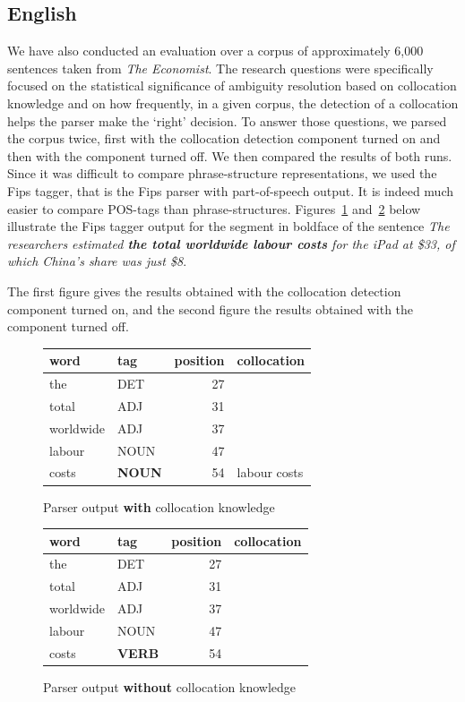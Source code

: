 \documentclass[output=paper]{langsci/langscibook}
\begin{document}
\subsection{English}
We have also conducted an evaluation over a corpus of approximately 6,000 sentences taken from \textit{The Economist}. The research questions were specifically focused on the statistical significance of ambiguity resolution based on collocation knowledge and on how frequently, in a given corpus, the detection of a collocation helps the parser make the `right' decision. 
To answer those questions, we parsed the corpus twice, first with the collocation detection component turned on and then with the component turned off. We then compared the results of both runs. Since it was difficult to compare phrase-structure representations, we used the Fips tagger, that is the Fips parser with part-of-speech output. It is indeed much easier to compare POS-tags than phrase-structures. Figures~\ref{fig7} and~\ref{fig8} below illustrate the Fips tagger output for the segment in boldface of the sentence \textit{The researchers estimated \textbf{the total worldwide labour costs} for the iPad at \$33, of which China’s share was just \$8}.

The first figure gives the results obtained with the collocation detection component turned on, and the second figure the results obtained with the component turned off.
 
\begin{figure}
\begin{tabular}{llrl}
word & tag & position & collocation \\ \hline
the & DET & 27\\
total & ADJ & 31 \\
worldwide & ADJ & 37 \\
labour & NOUN & 47 \\
costs & \textbf{NOUN} & 54 & labour costs
\end{tabular}
 \caption{\label{fig7}Parser output \textbf{with} collocation knowledge}
\end{figure} 
 

\begin{figure}
\begin{tabular}{llrl}
word & tag & position & collocation \\ \hline
the & DET & 27\\
total & ADJ & 31 \\
worldwide & ADJ & 37 \\
labour & NOUN & 47 \\
costs & \textbf{VERB} & 54 
\end{tabular}
 \caption{\label{fig8}Parser output \textbf{without} collocation knowledge}
\end{figure} 
 
\end{document}
